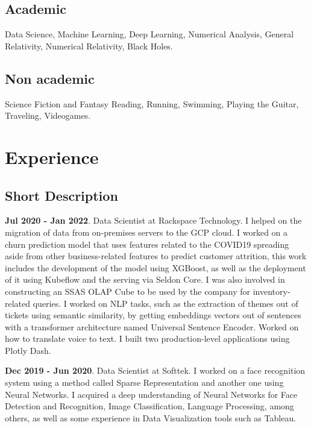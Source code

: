 \documentclass[a4paper,10pt]{article} %
\begin{document}
\subsection*{Academic}
Data Science, Machine Learning, Deep Learning, Numerical Analysis, General Relativity, Numerical Relativity, Black Holes.
\subsection*{Non academic}
Science Fiction and Fantasy Reading, Running, Swimming, Playing the Guitar, Traveling, Videogames. 
\bigskip

\section{Experience}
\bigskip

\subsection{Short Description}
\vspace{0.2cm}
\textbf{Jul 2020 - Jan 2022}. Data Scientist at Rackspace Technology. I helped on the migration of data from on-premises servers to the GCP cloud. I worked on a churn prediction model that uses features related to the COVID19 spreading aside from other business-related features to predict customer attrition, this work includes the development of the model using XGBoost, as well as the deployment of it using Kubeflow and the serving via Seldon Core. I was also involved in constructing an SSAS OLAP Cube to be used by the company for inventory-related queries. I worked on NLP tasks, such as the extraction of themes out of tickets using semantic similarity, by getting embeddings vectors out of sentences with a transformer architecture named Universal Sentence Encoder. Worked on how to translate voice to text. I built two production-level applications using Plotly Dash.

\textbf{Dec 2019 - Jun 2020}. Data Scientist at Softtek. I worked on a face recognition system using a method called Sparse Representation and another one using Neural Networks. I acquired a deep understanding of Neural Networks for Face Detection and Recognition, Image Classification, Language Processing, among others, as well as some experience in Data Visualization tools such as Tableau.
\end{document}
